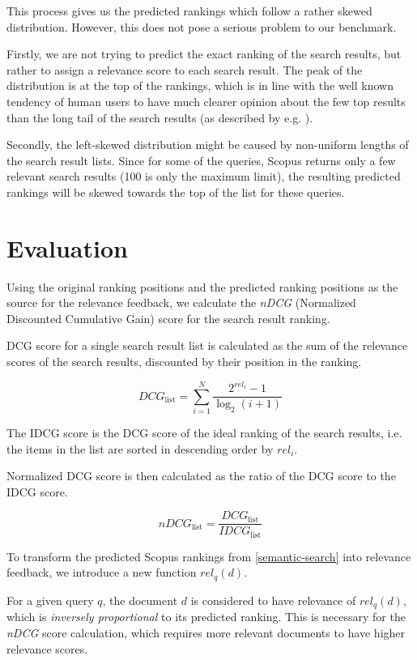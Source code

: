This process gives us the predicted rankings which follow a rather skewed distribution. 
However, this does not pose a serious problem to our benchmark.

Firstly, we are not trying to predict the exact ranking of the search results, but rather to assign a relevance score to each search result. 
The peak of the distribution is at the top of the rankings, 
which is in line with the well known tendency of human users 
to have much clearer opinion about the few top results than the long tail of the search results (as described by e.g. \cite{9357332}).

Secondly, the left-skewed distribution might be caused by non-uniform lengths of the search result lists. 
Since for some of the queries, Scopus returns only a few relevant search results (100 is only the maximum limit), 
the resulting predicted rankings will be skewed towards the top of the list for these queries.

\section{Evaluation}

Using the original ranking positions and the predicted ranking positions as the source for the 
relevance feedback, we calculate the \textit{nDCG} (Normalized Discounted Cumulative Gain) score for the 
search result ranking.

DCG score for a single search result list is calculated as the sum of the relevance scores of the search results, discounted by their position in the ranking.

$$
DCG_\text{list} = \sum_{i=1}^{N} \frac{2^{rel_i} - 1}{\log_2(i + 1)}
$$

The IDCG score is the DCG score of the ideal ranking of the search results, i.e. the items in the list are sorted in descending order by $rel_i$.

Normalized DCG score is then calculated as the ratio of the DCG score to the IDCG score.

$$
nDCG_{\text{list}} = \frac{DCG_\text{list}}{IDCG_\text{list}}
$$

To transform the predicted Scopus rankings from \ref{semantic-search} into relevance feedback, 
we introduce a new function $rel_q(d)$.

For a given query $q$, the document $d$ is considered to have relevance of $rel_q(d)$, 
which is \textit{inversely proportional} to its predicted ranking. 
This is necessary for the \textit{nDCG} score calculation, which requires more relevant documents 
to have higher relevance scores.

